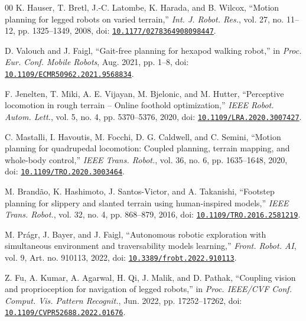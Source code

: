 \documentclass{ieeeaccess}
\begin{document}
\begin{thebibliography}{00}
K. Hauser, T. Bretl, J.-C. Latombe, K. Harada, and B. Wilcox, \textquotedblleft{}Motion planning for legged robots on varied terrain,\textquotedblright{} \emph{Int. J. Robot. Res.}, vol. 27, no. 11--12, pp. 1325--1349, 2008, doi: \href{https://doi.org/10.1177/0278364908098447}{\nolinkurl{10.1177/0278364908098447}}.

D. Valouch and J. Faigl, \textquotedblleft{}Gait-free planning for hexapod walking robot,\textquotedblright{} in \emph{Proc. Eur. Conf. Mobile Robots}, Aug. 2021, pp. 1--8, doi: \href{https://doi.org/10.1109/ECMR50962.2021.9568834}{\nolinkurl{10.1109/ECMR50962.2021.9568834}}.

F. Jenelten, T. Miki, A. E. Vijayan, M. Bjelonic, and M. Hutter, \textquotedblleft{}Perceptive locomotion in rough terrain -- Online foothold optimization,\textquotedblright{} \emph{IEEE Robot. Autom. Lett.}, vol. 5, no. 4, pp. 5370--5376, 2020, doi: \href{https://doi.org/10.1109/LRA.2020.3007427}{\nolinkurl{10.1109/LRA.2020.3007427}}.

C. Mastalli, I. Havoutis, M. Focchi, D. G. Caldwell, and C. Semini, \textquotedblleft{}Motion planning for quadrupedal locomotion: Coupled planning, terrain mapping, and whole-body control,\textquotedblright{} \emph{IEEE Trans. Robot.}, vol. 36, no. 6, pp. 1635--1648, 2020, doi: \href{https://doi.org/10.1109/TRO.2020.3003464}{\nolinkurl{10.1109/TRO.2020.3003464}}.

M. Brandão, K. Hashimoto, J. Santos-Victor, and A. Takanishi, \textquotedblleft{}Footstep planning for slippery and slanted terrain using human-inspired models,\textquotedblright{} \emph{IEEE Trans. Robot.}, vol. 32, no. 4, pp. 868--879, 2016, doi: \href{https://doi.org/10.1109/TRO.2016.2581219}{\nolinkurl{10.1109/TRO.2016.2581219}}.

M. Prágr, J. Bayer, and J. Faigl, \textquotedblleft{}Autonomous robotic exploration with simultaneous environment and traversability models learning,\textquotedblright{} \emph{Front. Robot. AI}, vol. 9, Art. no. 910113, 2022, doi: \href{https://doi.org/10.3389/frobt.2022.910113}{\nolinkurl{10.3389/frobt.2022.910113}}.

Z. Fu, A. Kumar, A. Agarwal, H. Qi, J. Malik, and D. Pathak, \textquotedblleft{}Coupling vision and proprioception for navigation of legged robots,\textquotedblright{} in \emph{Proc. IEEE/CVF Conf. Comput. Vis. Pattern Recognit.}, Jun. 2022, pp. 17252--17262, doi: \href{https://doi.org/10.1109/CVPR52688.2022.01676}{\nolinkurl{10.1109/CVPR52688.2022.01676}}.


\end{thebibliography}
\end{document}
